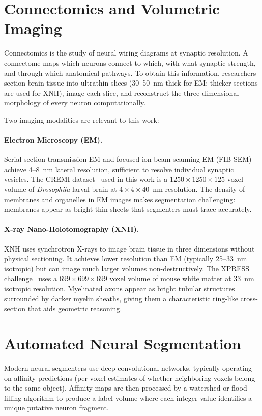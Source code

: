 \section{Connectomics and Volumetric Imaging}

Connectomics is the study of neural wiring diagrams at synaptic resolution.
A connectome maps which neurons connect to which, with what synaptic strength,
and through which anatomical pathways. To obtain this information, researchers
section brain tissue into ultrathin slices (30--50~nm thick for EM; thicker
sections are used for XNH), image each slice, and reconstruct the
three-dimensional morphology of every neuron computationally.

Two imaging modalities are relevant to this work:

\paragraph{Electron Microscopy (EM).}
Serial-section transmission EM and focused ion beam scanning EM (FIB-SEM)
achieve 4--8~nm lateral resolution, sufficient to resolve individual synaptic
vesicles. The CREMI dataset~\cite{cremi2016} used in this work is a
$1250 \times 1250 \times 125$ voxel volume of \emph{Drosophila} larval brain
at $4 \times 4 \times 40$~nm resolution. The density of membranes and
organelles in EM images makes segmentation challenging: membranes appear as
bright thin sheets that segmenters must trace accurately.

\paragraph{X-ray Nano-Holotomography (XNH).}
XNH uses synchrotron X-rays to image brain tissue in three dimensions without
physical sectioning. It achieves lower resolution than EM (typically 25--33~nm
isotropic) but can image much larger volumes non-destructively. The XPRESS
challenge~\cite{xpress2023} uses a $699 \times 699 \times 699$ voxel volume of
mouse white matter at 33~nm isotropic resolution. Myelinated axons appear as
bright tubular structures surrounded by darker myelin sheaths, giving them
a characteristic ring-like cross-section that aids geometric reasoning.

\section{Automated Neural Segmentation}

Modern neural segmenters use deep convolutional networks, typically operating
on affinity predictions (per-voxel estimates of whether neighboring voxels
belong to the same object). Affinity maps are then processed by a watershed
or flood-filling algorithm to produce a label volume where each integer value
identifies a unique putative neuron fragment.

